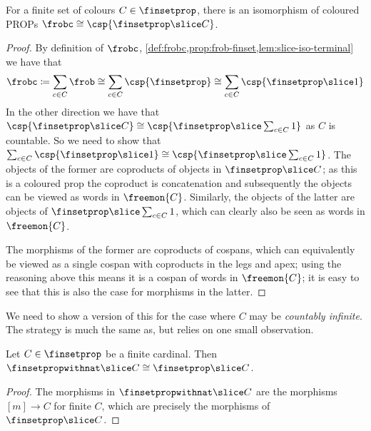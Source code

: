 \begin{theorem}
    \label{thm:frobc-iso-finset-slice-c}
    For a finite set of colours \(C \in \finsetprop\), there is an isomorphism
    of coloured PROPs \(\frobc \cong \csp{\finsetprop \slice C}\).
\end{theorem}
\begin{proof}
    By definition of \(\frobc\),
    \cref{def:frobc,prop:frob-finset,lem:slice-iso-terminal}
    we have that \[
        \frobc
        \coloneqq
        \sum_{c \in C}\frob
        \cong
        \sum_{c \in C}\csp{\finsetprop}
        \cong
        \sum_{c \in C}\csp{\finsetprop \slice 1}
    \]
    In the other direction we have that \(
        \csp{\finsetprop \slice C}
        \cong
        \csp{\finsetprop \slice \sum_{c \in C} 1}
    \) as \(C\) is countable.
    So we need to show that \(
        \sum_{c \in C}\csp{\finsetprop \slice 1}
        \cong
        \csp{\finsetprop \slice \sum_{c \in C} 1}
    \).
    The objects of the former are coproducts of objects in
    \(\finsetprop \slice C\); as this is a coloured prop the coproduct is
    concatenation and subsequently the objects can be viewed as words in
    \(\freemon{C}\).
    Similarly, the objects of the latter are objects of
    \(\finsetprop \slice \sum_{c \in C} 1\), which can clearly also be
    seen as words in \(\freemon{C}\).

    The morphisms of the former are coproducts of cospans, which can
    equivalently be viewed as a single cospan with coproducts in the legs and
    apex; using the reasoning above this means it is a cospan of words in
    \(\freemon{C}\); it is easy to see that this is also the case for morphisms
    in the latter.
\end{proof}

We need to show a version of this for the case where \(C\) may be
\emph{countably infinite}.
The strategy is much the same as, but relies on one small observation.

\begin{lemma}
    \label{lem:finsetprop-finite}
    Let \(C \in \finsetprop\) be a finite cardinal.
    Then \(\finsetpropwithnat \slice C \cong \finsetprop \slice C\).
\end{lemma}
\begin{proof}
    The morphisms in \(\finsetpropwithnat \slice C\) are the morphisms
    \([m] \to C\) for finite \(C\), which are precisely the morphisms of
    \(\finsetprop \slice C\).
\end{proof}

